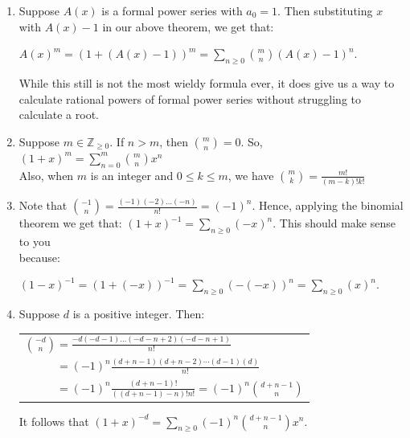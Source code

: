 \documentclass{book}
\newcommand{\exOne}{%
   \color{Purple}%
   \fontsize{13}{15}\selectfont%
}
\newenvironment{myIndent}{%
   \begin{adjustwidth}{2.5em}{0em}%
}{%
   \end{adjustwidth}%
}
\newcommand{\retTwo}{\hfill\bigbreak}
\begin{document}
\begin{myIndent}\exOne
   \begin{enumerate}
      \item Suppose $A(x)$ is a formal power series with $a_0 = 1$. Then substituting $x$ with $A(x) - 1$ in our above theorem, we get that:\\ [-15pt]
      
      {\centering $A(x)^m = (1 + (A(x) - 1))^m = \sum\limits_{n \geq 0}
      \binom{m}{n}(A(x) - 1)^n$. \retTwo\par}

      While this still is not the most wieldy formula ever, it does give us a way to calculate rational powers of formal power series without struggling to calculate a root.\retTwo

      \item Suppose $m \in \mathbb{Z}_{\geq 0}$. If $n > m$, then $
      \binom{m}{n} = 0$. So, $(1 + x)^m = \sum\limits_{n = 0}^m
      \binom{m}{n}x^n$\\ [-3pt]

      Also, when $m$ is an integer and $0 \leq k \leq m$, we have $\binom{m}{k} = \frac{m!}{(m-k)!k!}$\retTwo

      \item Note that $
      \binom{-1}{n} = \frac{(-1)(-2)\ldots(-n)}{n!} = (-1)^n$. Hence, applying the binomial\\ theorem we get that: $(1 + x)^{-1} = \sum\limits_{n \geq 0 }(-x)^n$. This should make sense to you\\ [-8pt] because:
      
      {\centering$(1 -x)^{-1} = (1 + (-x))^{-1} = \sum\limits_{n \geq 0 }(-(-x))^n = \sum\limits_{n \geq 0 }(x)^n$.\newpage\par}

      \item Suppose $d$ is a positive integer. Then:
      
      {\centering 
      \begin{tabular}{l}
         $\binom{-d}{n} = \frac{-d(-d-1)\ldots(-d-n+2)(-d-n+1)}{n!}$\\ [8pt]$\phantom{\binom{-d}{n}} = (-1)^n\frac{(d+n-1)(d+n-2)\cdots(d-1)(d)}{n!}$\\ [8pt] $\phantom{\binom{-d}{n}} = (-1)^n\frac{(d+n-1)!}{((d+n-1)-n)!n!} = (-1)^n\binom{d+n-1}{n}$
      \end{tabular}\retTwo\par}

      It follows that $(1 + x)^{-d} = \sum\limits_{n \geq 0}(-1)^n\binom{d+n-1}{n}x^n$.\retTwo


\end{enumerate}
\end{myIndent}
\end{document}
